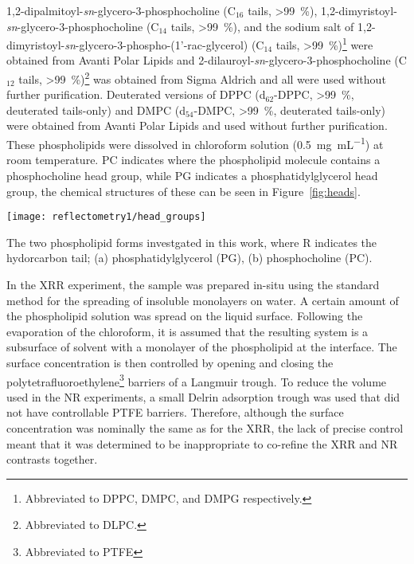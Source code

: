 1,2-dipalmitoyl-\emph{sn}-glycero-3-phosphocholine (C$_{16}$ tails, \SI{>99}{\percent}), 1,2-dimyristoyl-\emph{sn}-glycero-3-phosphocholine (C$_{14}$ tails, \SI{>99}{\percent}), and the sodium salt of 1,2-dimyristoyl-\emph{sn}-glycero-3-phospho-(1'-rac-glycerol) (C$_{14}$ tails, \SI{>99}{\percent})\footnote{Abbreviated to DPPC, DMPC, and DMPG respectively.} were obtained from Avanti Polar Lipids and 2-dilauroyl-\emph{sn}-glycero-3-phosphocholine (C$_{12}$ tails, \SI{>99}{\percent})\footnote{Abbreviated to DLPC.} was obtained from Sigma Aldrich and all were used without further purification.
Deuterated versions of DPPC (d$_{62}$-DPPC, \SI{>99}{\percent}, deuterated tails-only) and DMPC (d$_{54}$-DMPC, \SI{>99}{\percent}, deuterated tails-only) were obtained from Avanti Polar Lipids and used without further purification.
These phospholipids were dissolved in chloroform solution (\SI{0.5}{\milli\gram\per\milli\liter}) at room temperature.
PC indicates where the phospholipid molecule contains a phosphocholine head group, while PG indicates a phosphatidylglycerol head group, the chemical structures of these can be seen in Figure~\ref{fig:heads}.
%
\begin{marginfigure}
    \centering
    \texttt{[image: reflectometry1/head\_groups]}
    \caption{The two phospholipid forms investgated in this work, where R indicates the hydorcarbon tail; (a) phosphatidylglycerol (PG), (b) phosphocholine (PC).}
    \label{fig:heads}
\end{marginfigure}
%

In the XRR experiment, the sample was prepared in-situ using the standard method for the spreading of insoluble monolayers on water.
A certain amount of the phospholipid solution was spread on the liquid surface.
Following the evaporation of the chloroform, it is assumed that the resulting system is a subsurface of solvent with a monolayer of the phospholipid at the interface.
The surface concentration is then controlled by opening and closing the polytetrafluoroethylene\footnote{Abbreviated to PTFE} barriers of a Langmuir trough.
To reduce the volume used in the NR experiments, a small Delrin adsorption trough was used that did not have controllable PTFE barriers.
Therefore, although the surface concentration was nominally the same as for the XRR, the lack of precise control meant that it was determined to be inappropriate to co-refine the XRR and NR contrasts together.

